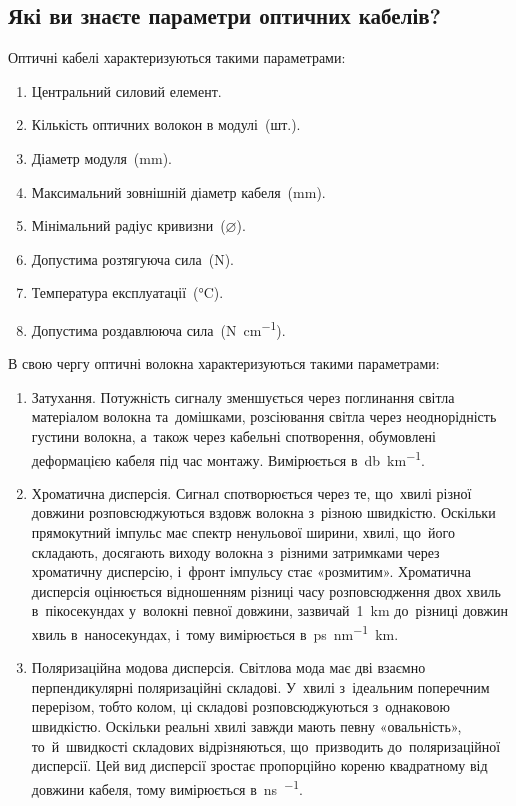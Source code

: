 \documentclass[
	a4paper,
	oneside,
	BCOR = 10mm,
	DIV = 12,
	12pt,
	headings = normal,
]{scrartcl}
\begin{document}
		\subsection{Які ви знаєте параметри оптичних кабелів?}
			Оптичні кабелі характеризуються такими параметрами:
			\begin{enumerate}[noitemsep]
				\item Центральний силовий елемент.
				\item Кількість оптичних волокон в модулі~(шт.).
				\item Діаметр модуля~(\si{\milli\meter}).
				\item Максимальний зовнішній діаметр кабеля~(\si{\milli\meter}).
				\item Мінімальний радіус кривизни~($\diameter$).
				\item Допустима розтягуюча сила~(\si{\newton}).
				\item Температура експлуатації~(\si{\degreeCelsius}).
				\item Допустима роздавлююча сила~(\si{\newton\per\centi\meter}).
			\end{enumerate}
			В свою чергу оптичні волокна характеризуються такими параметрами:
			\begin{enumerate}
				\item Затухання. Потужність сигналу зменшується через поглинання світла матеріалом волокна та~домішками, розсіювання світла через неоднорідність густини волокна, а~також через кабельні спотворення, обумовлені деформацією кабеля під час монтажу. Вимірюється в~\si{\decibel\per\kilo\meter}.
				\item Хроматична дисперсія. Сигнал спотворюється через те, що~хвилі різної довжини розповсюджуються вздовж волокна з~різною швидкістю. Оскільки прямокутний імпульс має спектр ненульової ширини, хвилі, що~його складають, досягають виходу волокна з~різними затримками через хроматичну дисперсію, і~фронт імпульсу стає «розмитим». Хроматична дисперсія оцінюється відношенням різниці часу розповсюдження двох хвиль в~пікосекундах у~волокні певної довжини, зазвичай~\SI{1}{\kilo\metre} до~різниці довжин хвиль в~наносекундах, і~тому вимірюється в~\si{\pico\second\per\nano\metre\kilo\metre}.
				\item Поляризаційна модова дисперсія. Світлова мода має дві взаємно перпендикулярні поляризаційні складові. У~хвилі з~ідеальним поперечним перерізом, тобто колом, ці складові розповсюджуються з~однаковою швидкістю. Оскільки реальні хвилі завжди мають певну «овальність», то~й~швидкості складових відрізняються, що~призводить до~поляризаційної дисперсії. Цей вид дисперсії зростає пропорційно кореню квадратному від довжини кабеля, тому вимірюється в~\si{\nano\second\per\sqrt{\kilo\meter}}.
			\end{enumerate}
\end{document}
